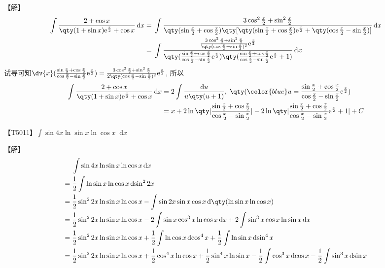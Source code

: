 \documentclass{ctexbook}
\newcommand{\e}{\mathrm{e}}
\newcommand*{\dif}{\mathop{}\!\mathrm{d}}
\begin{document}
{【解】
\begin{align*}
\int\frac{2+\cos{x}}{\qty(1+\sin{x})\e^{\frac{x}{2}}+\cos{x}}\dif{x}={}&\int\frac{3\cos^{2}{\frac{x}{2}}+\sin^{2}{\frac{x}{2}}}{\qty(\sin{\frac{x}{2}}+\cos{\frac{x}{2}})\qty[\qty(\sin{\frac{x}{2}}+\cos{\frac{x}{2}})\e^{\frac{x}{2}}+\qty(\cos{\frac{x}{2}}-\sin{\frac{x}{2}})]}\dif{x}\\
={}&\int\frac{\frac{3\cos^{2}{\frac{x}{2}}+\sin^{2}{\frac{x}{2}}}{\qty(\cos{\frac{x}{2}}-\sin{\frac{x}{2}})^{2}}\e^{\frac{x}{2}}}{\qty(\frac{\sin{\frac{x}{2}}+\cos{\frac{x}{2}}}{\cos{\frac{x}{2}}-\sin{\frac{x}{2}}}\e^{\frac{x}{2}})\qty(\frac{\sin{\frac{x}{2}}+\cos{\frac{x}{2}}}{\cos{\frac{x}{2}}-\sin{\frac{x}{2}}}\e^{\frac{x}{2}}+1)}\dif{x}
\end{align*}
试导可知$\dv{x}(\frac{\sin{\frac{x}{2}}+\cos{\frac{x}{2}}}{\cos{\frac{x}{2}}-\sin{\frac{x}{2}}}\e^{\frac{x}{2}})=\frac{3\cos^{2}{\frac{x}{2}}+\sin^{2}{\frac{x}{2}}}{2\qty(\cos{\frac{x}{2}}-\sin{\frac{x}{2}})^{2}}\e^{\frac{x}{2}}$, 所以
\begin{align*}
\int\frac{2+\cos{x}}{\qty(1+\sin{x})\e^{\frac{x}{2}}+\cos{x}}\dif{x}={}&2\int\frac{\dif{u}}{u\qty(u+1)},\;\qty(\color{blue}u=\frac{\sin{\frac{x}{2}}+\cos{\frac{x}{2}}}{\cos{\frac{x}{2}}-\sin{\frac{x}{2}}}\e^{\frac{x}{2}})\\
={}&x+2\ln\qty|\frac{\sin{\frac{x}{2}}+\cos{\frac{x}{2}}}{\cos{\frac{x}{2}}-\sin{\frac{x}{2}}}|-2\ln\qty|\frac{\sin{\frac{x}{2}}+\cos{\frac{x}{2}}}{\cos{\frac{x}{2}}-\sin{\frac{x}{2}}}\e^{\frac{x}{2}}+1|+C
\end{align*}\par
【T5011】$\int\sin{4x}\ln{\sin{x}}\ln{\cos{x}}\dif{x}$\par
【解】
\begin{align*}
{}&\int\sin{4x}\ln{\sin{x}}\ln{\cos{x}}\dif{x}\\
={}&\frac{1}{2}\int\ln{\sin{x}}\ln{\cos{x}}\dif{\sin^{2}{2x}}\\
={}&\frac{1}{2}\sin^{2}{2x}\ln{\sin{x}}\ln{\cos{x}}-\int\sin{2x}\sin{x}\cos{x}\dif{\qty(\ln{\sin{x}}\ln{\cos{x}})}\\
={}&\frac{1}{2}\sin^{2}{2x}\ln{\sin{x}}\ln{\cos{x}}-2\int\sin{x}\cos^{3}{x}\ln{\cos{x}}\dif{x}+2\int\sin^{3}{x}\cos{x}\ln{\sin{x}}\dif{x}\\
={}&\frac{1}{2}\sin^{2}{2x}\ln{\sin{x}}\ln{\cos{x}}+\frac{1}{2}\int\ln{\cos{x}}\dif{\cos^{4}{x}}+\frac{1}{2}\int\ln{\sin{x}}\dif{\sin^{4}{x}}\\
={}&\frac{1}{2}\sin^{2}{2x}\ln{\sin{x}}\ln{\cos{x}}+\frac{1}{2}\cos^{4}{x}\ln{\cos{x}}+\frac{1}{2}\sin^{4}{x}\ln{\sin{x}}-\frac{1}{2}\int\cos^{3}{x}\dif{\cos{x}}-\frac{1}{2}\int\sin^{3}{x}\dif{\sin{x}}\\

\end{align*}}
\end{document}
